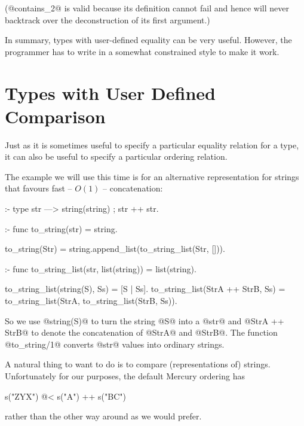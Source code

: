 (@contains_2@ is valid because its definition cannot fail and hence will
never backtrack over the deconstruction of its first argument.)

In summary, types with user-defined equality can be very useful.  However,
the programmer has to write in a somewhat constrained style to make it work.

\section{Types with User Defined Comparison}



Just as it is sometimes useful to specify a particular equality relation for
a type, it can also be useful to specify a particular ordering relation.

The example we will use this time is for an alternative representation for
strings that favours fast -- $O(1)$ -- concatenation:
\begin{myverbatim}
:- type str ---> string(string) ; str ++ str.

:- func to_string(str) = string.

to_string(Str) = string.append_list(to_string_list(Str, [])).

:- func to_string_list(str, list(string)) = list(string).

to_string_list(string(S),    Ss) = [S | Ss].
to_string_list(StrA ++ StrB, Ss) =
    to_string_list(StrA, to_string_list(StrB, Ss)).
\end{myverbatim}
So we use @string(S)@ to turn the string @S@ into a @str@ and
@StrA ++ StrB@ to denote the concatenation of @StrA@ and @StrB@.  The
function @to_string/1@ converts @str@ values into ordinary strings.

A natural thing to want to do is to compare (representations of) strings.
Unfortunately for our purposes, the default Mercury ordering has
\begin{myverbatim}
    s("ZYX")  @<  s("A") ++ s("BC")
\end{myverbatim}
rather than the other way around as we would prefer.

